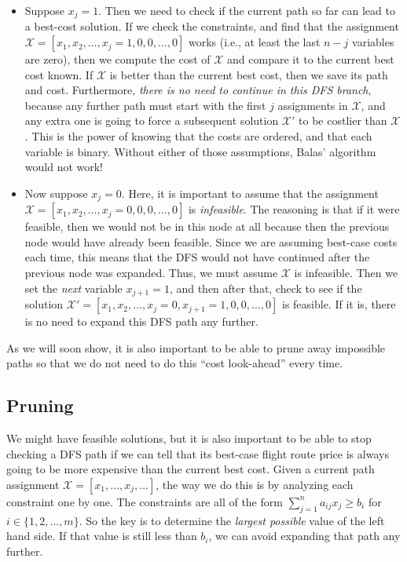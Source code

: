 \documentclass{article}
\begin{document}
\begin{itemize}[noitemsep]
    \item Suppose $x_j = 1$. Then we need to check if the current path so far can lead to a best-cost solution. If we check the constraints, and find
    that the assignment $\mathcal{X} = [x_1,x_2,\ldots,x_j=1, 0, 0, \ldots, 0]$ works (i.e., at least the last $n-j$ variables are zero), then we
    compute the cost of $\mathcal{X}$ and compare it to the current best cost known. If $\mathcal{X}$ is better than the current best cost, then we
    save its path and cost. Furthermore, \emph{there is no need to continue in this DFS branch}, because any further path must start with the first
    $j$ assignments in $\mathcal{X}$, and any extra one is going to force a subsequent solution $\mathcal{X}'$ to be costlier than $\mathcal{X}$. This
    is the power of knowing that the costs are ordered, and that each variable is binary. Without either of those assumptions, Balas' algorithm would
    not work!
    \item Now suppose $x_j = 0$. Here, it is important to assume that the assignment $\mathcal{X} = [x_1,x_2,\ldots,x_j=0,0,0,\ldots, 0]$ is
    \emph{infeasible}. The reasoning is that if it were feasible, then we would not be in this node at all because then the previous node would have
    already been feasible. Since we are assuming best-case costs each time, this means that the DFS would not have continued after the previous node
    was expanded. Thus, we must assume $\mathcal{X}$ is infeasible. Then we set the \emph{next} variable $x_{j+1} = 1$, and then after that, check to
    see if the solution $\mathcal{X}' = [x_1,x_2,\ldots,x_j=0,x_{j+1}=1,0,0,\ldots,0]$ is feasible. If it is, there is no need to expand this DFS
    path any further.
\end{itemize}

As we will soon show, it is also important to be able to prune away impossible paths so that we do not need to do this ``cost look-ahead'' every time.

\subsection{Pruning}

We might have feasible solutions, but it is also important to be able to stop checking a DFS path if we can tell that its best-case flight route price
is always going to be more expensive than the current best cost. Given a current path assignment $\mathcal{X} = [x_1,\ldots, x_j, \ldots]$, the way we
do this is by analyzing each constraint one by one. The constraints are all of the form $\sum_{j=1}^{n} a_{ij}x_j \ge b_i$ for $i \in
\{1,2,\ldots,m\}$. So the key is to determine the \emph{largest possible} value of the left hand side. If that value is still less than $b_i$, we can
avoid expanding that path any further.
\end{document}
